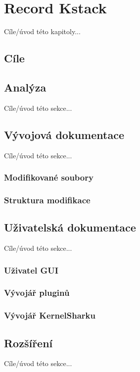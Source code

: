 \chapter{Record Kstack}
Cíle/úvod této kapitoly...

\section{Cíle}

\section{Analýza}
Cíle/úvod této sekce...

\section{Vývojová dokumentace}
Cíle/úvod této sekce...

\subsection{Modifikované soubory}

\subsection{Struktura modifikace}

\section{Uživatelská dokumentace}
Cíle/úvod této sekce...

\subsection{Uživatel GUI}

\subsection{Vývojář pluginů}

\subsection{Vývojář KernelSharku}

\section{Rozšíření}
Cíle/úvod této sekce...